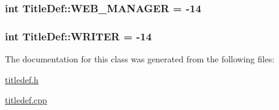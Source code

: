\subsubsection[{W\+E\+B\+\_\+\+M\+A\+N\+A\+G\+E\+R}]{\setlength{\rightskip}{0pt plus 5cm}int Title\+Def\+::\+W\+E\+B\+\_\+\+M\+A\+N\+A\+G\+E\+R = -\/14\hspace{0.3cm}{\ttfamily [static]}}\label{class_title_def_a0c78b28b9f186f35e5958d8d5b0af181}
\hypertarget{class_title_def_abecd202483b1db76915deabfb609073a}{}
\subsubsection[{W\+R\+I\+T\+E\+R}]{\setlength{\rightskip}{0pt plus 5cm}int Title\+Def\+::\+W\+R\+I\+T\+E\+R = -\/14\hspace{0.3cm}{\ttfamily [static]}}\label{class_title_def_abecd202483b1db76915deabfb609073a}


The documentation for this class was generated from the following files\+:\begin{DoxyCompactItemize}
\item 
\hyperlink{titledef_8h}{titledef.\+h}\item 
\hyperlink{titledef_8cpp}{titledef.\+cpp}\end{DoxyCompactItemize}
